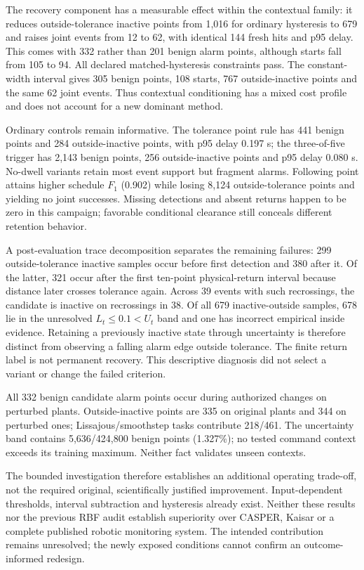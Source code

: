 The recovery component has a measurable effect within the contextual family: it reduces outside-tolerance inactive points from 1,016 for ordinary hysteresis to 679 and raises joint events from 12 to 62, with identical 144 fresh hits and p95 delay. This comes with 332 rather than 201 benign alarm points, although starts fall from 105 to 94. All declared matched-hysteresis constraints pass. The constant-width interval gives 305 benign points, 108 starts, 767 outside-inactive points and the same 62 joint events. Thus contextual conditioning has a mixed cost profile and does not account for a new dominant method.

Ordinary controls remain informative. The tolerance point rule has 441 benign points and 284 outside-inactive points, with p95 delay 0.197 s; the three-of-five trigger has 2,143 benign points, 256 outside-inactive points and p95 delay 0.080 s. No-dwell variants retain most event support but fragment alarms. Following point attains higher schedule $F_1$ (0.902) while losing 8,124 outside-tolerance points and yielding no joint successes. Missing detections and absent returns happen to be zero in this campaign; favorable conditional clearance still conceals different retention behavior.

A post-evaluation trace decomposition separates the remaining failures: 299 outside-tolerance inactive samples occur before first detection and 380 after it. Of the latter, 321 occur after the first ten-point physical-return interval because distance later crosses tolerance again. Across 39 events with such recrossings, the candidate is inactive on recrossings in 38. Of all 679 inactive-outside samples, 678 lie in the unresolved $L_t\le0.1<U_t$ band and one has incorrect empirical inside evidence. Retaining a previously inactive state through uncertainty is therefore distinct from observing a falling alarm edge outside tolerance. The finite return label is not permanent recovery. This descriptive diagnosis did not select a variant or change the failed criterion.

All 332 benign candidate alarm points occur during authorized changes on perturbed plants. Outside-inactive points are 335 on original plants and 344 on perturbed ones; Lissajous/smoothstep tasks contribute 218/461. The uncertainty band contains 5,636/424,800 benign points (1.327\%); no tested command context exceeds its training maximum. Neither fact validates unseen contexts.

The bounded investigation therefore establishes an additional operating trade-off, not the required original, scientifically justified improvement. Input-dependent thresholds, interval subtraction and hysteresis already exist. Neither these results nor the previous RBF audit establish superiority over CASPER, Kaisar or a complete published robotic monitoring system. The intended contribution remains unresolved; the newly exposed conditions cannot confirm an outcome-informed redesign.
